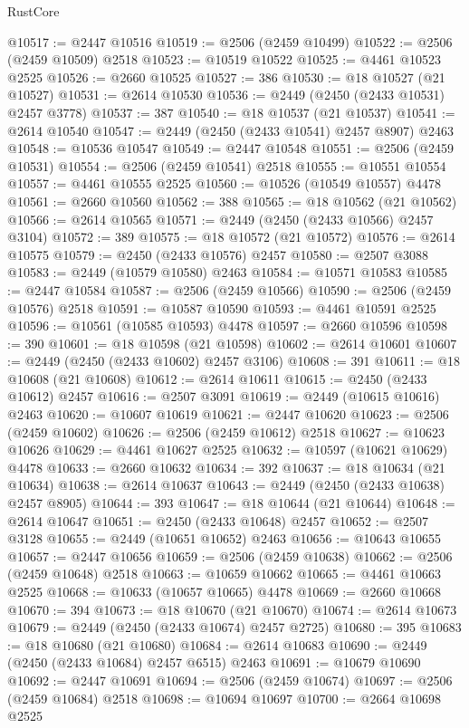 \begin{lexlean}{RustCore}
\begin{coremodule}
@10517 := @2447 @10516
@10519 := @2506 (@2459 @10499)
@10522 := @2506 (@2459 @10509) @2518
@10523 := @10519 @10522
@10525 := @4461 @10523 @2525
@10526 := @2660 @10525
@10527 := 386
@10530 := @18 @10527 (@21 @10527)
@10531 := @2614 @10530
@10536 := @2449 (@2450 (@2433 @10531) @2457 @3778)
@10537 := 387
@10540 := @18 @10537 (@21 @10537)
@10541 := @2614 @10540
@10547 := @2449 (@2450 (@2433 @10541) @2457 @8907) @2463
@10548 := @10536 @10547
@10549 := @2447 @10548
@10551 := @2506 (@2459 @10531)
@10554 := @2506 (@2459 @10541) @2518
@10555 := @10551 @10554
@10557 := @4461 @10555 @2525
@10560 := @10526 (@10549 @10557) @4478
@10561 := @2660 @10560
@10562 := 388
@10565 := @18 @10562 (@21 @10562)
@10566 := @2614 @10565
@10571 := @2449 (@2450 (@2433 @10566) @2457 @3104)
@10572 := 389
@10575 := @18 @10572 (@21 @10572)
@10576 := @2614 @10575
@10579 := @2450 (@2433 @10576) @2457
@10580 := @2507 @3088
@10583 := @2449 (@10579 @10580) @2463
@10584 := @10571 @10583
@10585 := @2447 @10584
@10587 := @2506 (@2459 @10566)
@10590 := @2506 (@2459 @10576) @2518
@10591 := @10587 @10590
@10593 := @4461 @10591 @2525
@10596 := @10561 (@10585 @10593) @4478
@10597 := @2660 @10596
@10598 := 390
@10601 := @18 @10598 (@21 @10598)
@10602 := @2614 @10601
@10607 := @2449 (@2450 (@2433 @10602) @2457 @3106)
@10608 := 391
@10611 := @18 @10608 (@21 @10608)
@10612 := @2614 @10611
@10615 := @2450 (@2433 @10612) @2457
@10616 := @2507 @3091
@10619 := @2449 (@10615 @10616) @2463
@10620 := @10607 @10619
@10621 := @2447 @10620
@10623 := @2506 (@2459 @10602)
@10626 := @2506 (@2459 @10612) @2518
@10627 := @10623 @10626
@10629 := @4461 @10627 @2525
@10632 := @10597 (@10621 @10629) @4478
@10633 := @2660 @10632
@10634 := 392
@10637 := @18 @10634 (@21 @10634)
@10638 := @2614 @10637
@10643 := @2449 (@2450 (@2433 @10638) @2457 @8905)
@10644 := 393
@10647 := @18 @10644 (@21 @10644)
@10648 := @2614 @10647
@10651 := @2450 (@2433 @10648) @2457
@10652 := @2507 @3128
@10655 := @2449 (@10651 @10652) @2463
@10656 := @10643 @10655
@10657 := @2447 @10656
@10659 := @2506 (@2459 @10638)
@10662 := @2506 (@2459 @10648) @2518
@10663 := @10659 @10662
@10665 := @4461 @10663 @2525
@10668 := @10633 (@10657 @10665) @4478
@10669 := @2660 @10668
@10670 := 394
@10673 := @18 @10670 (@21 @10670)
@10674 := @2614 @10673
@10679 := @2449 (@2450 (@2433 @10674) @2457 @2725)
@10680 := 395
@10683 := @18 @10680 (@21 @10680)
@10684 := @2614 @10683
@10690 := @2449 (@2450 (@2433 @10684) @2457 @6515) @2463
@10691 := @10679 @10690
@10692 := @2447 @10691
@10694 := @2506 (@2459 @10674)
@10697 := @2506 (@2459 @10684) @2518
@10698 := @10694 @10697
@10700 := @2664 @10698 @2525

\end{coremodule}
\end{lexlean}
